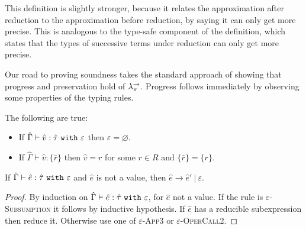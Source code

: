 This definition is slightly stronger, because it relates the approximation after reduction to the approximation before reduction, by saying it can only get more precise. This is analogous to the type-safe component of the definition, which states that the types of successive terms under reduction can only get more precise.

Our road to proving soundness takes the standard approach of showing that progress and preservation hold of $\lambda^{\rightarrow}_{\pi}$. Progress follows immediately by observing some properties of the typing rules.

\begin{lemma}
The following are true:
\begin{itemize}
	\setlength\itemsep{-0.7em}
	\item If $\hat \Gamma \vdash \hat v: \hat \tau~\mathtt{with}~ \varepsilon$ then $\varepsilon = \varnothing$.
	\item If $\hat \Gamma \vdash \hat v: \{ \bar r \}$ then $\hat v = r$ for some $r \in R$ and $\{ \bar r \} = \{ r \}$.
\end{itemize}
\end{lemma}

\begin{theorem}[Progress]
If $\hat \Gamma \vdash \hat e: \hat \tau~\mathtt{with}~ \varepsilon$ and $\hat e$ is not a value, then $\hat e \longrightarrow \hat e'~|~\varepsilon$.
\end{theorem}

\begin{proof} By induction on $\hat \Gamma \vdash \hat e: \hat \tau~\mathtt{with}~ \varepsilon$, for $\hat e$ not a value. If the rule is \textsc{$\varepsilon$-Subsumption} it follows by inductive hypothesis. If $\hat e$ has a reducible subexpression then reduce it. Otherwise use one of \textsc{$\varepsilon$-App3} or \textsc{$\varepsilon$-OperCall2}.
\end{proof}





























